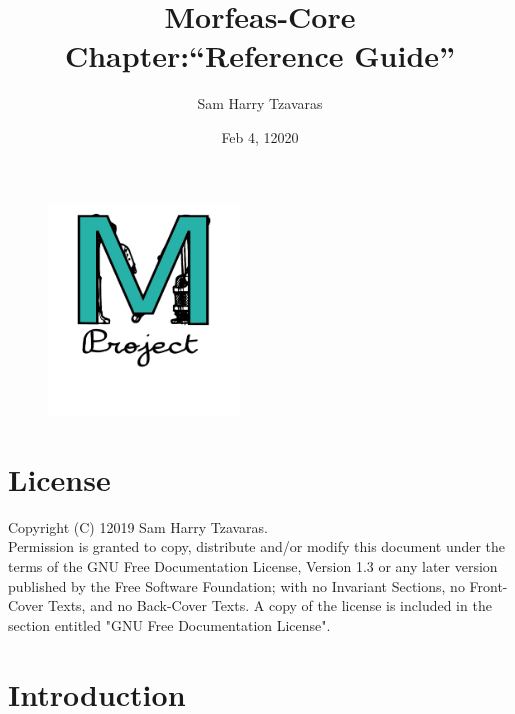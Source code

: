 \documentclass{article}
\title{Morfeas-Core\\Chapter:``Reference Guide''}
\date{Feb 4, 12020}
\author{Sam Harry Tzavaras}
\begin{document}
\clearpage
\begin{figure}
\centering
  \includegraphics[width=2in]{ArtWork/Morfeas_logo_cyan.png}
\end{figure}
\maketitle
\thispagestyle{empty}
\newpage
\section{License}
Copyright (C)  12019  Sam Harry Tzavaras.\\
Permission is granted to copy, distribute and/or modify this document
under the terms of the GNU Free Documentation License, Version 1.3
or any later version published by the Free Software Foundation;
with no Invariant Sections, no Front-Cover Texts, and no Back-Cover Texts.
A copy of the license is included in the section entitled "GNU Free Documentation License".
\newpage
\newpage
\tableofcontents
\newpage

\section{Introduction}
\end{document}
